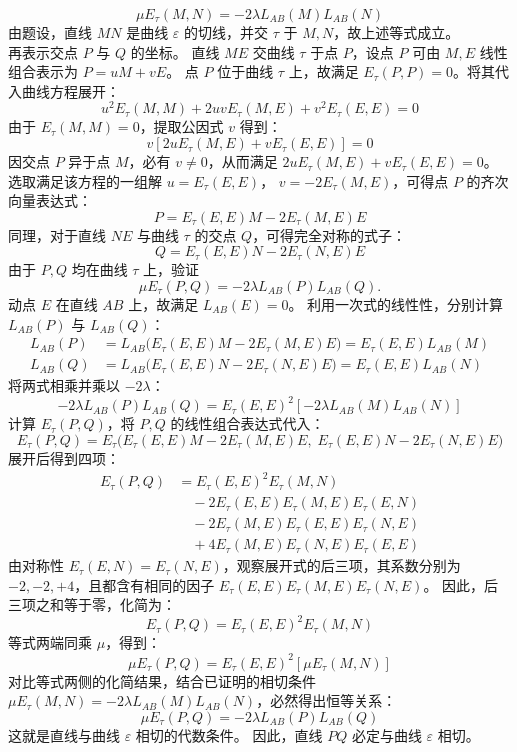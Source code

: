 \begin{solution}
\[ \mu E_\tau(M,N) = -2\lambda L_{AB}(M)L_{AB}(N) \]
由题设，直线 $MN$ 是曲线 $\varepsilon$ 的切线，并交 $\tau$ 于 $M, N$，故上述等式成立。\\
再表示交点 $P$ 与 $Q$ 的坐标。
直线 $ME$ 交曲线 $\tau$ 于点 $P$，设点 $P$ 可由 $M, E$ 线性组合表示为 $P = u M + v E$。
点 $P$ 位于曲线 $\tau$ 上，故满足 $E_\tau(P,P) = 0$。将其代入曲线方程展开：
\[ u^2 E_\tau(M,M) + 2uv E_\tau(M,E) + v^2 E_\tau(E,E) = 0 \]
由于 $E_\tau(M,M) = 0$，提取公因式 $v$ 得到：
\[ v [2u E_\tau(M,E) + v E_\tau(E,E)] = 0 \]
因交点 $P$ 异于点 $M$，必有 $v \neq 0$，从而满足 $2u E_\tau(M,E) + v E_\tau(E,E) = 0$。
选取满足该方程的一组解 $u = E_\tau(E,E)$， $v = -2E_\tau(M,E)$，可得点 $P$ 的齐次向量表达式：
\[ P = E_\tau(E,E)M - 2E_\tau(M,E)E \]
同理，对于直线 $NE$ 与曲线 $\tau$ 的交点 $Q$，可得完全对称的式子：
\[ Q = E_\tau(E,E)N - 2E_\tau(N,E)E \]
由于 $P,Q$ 均在曲线 $\tau$ 上，验证
\[
\mu E_\tau(P,Q)=-2\lambda L_{AB}(P)L_{AB}(Q).
\]
动点 $E$ 在直线 $AB$ 上，故满足 $L_{AB}(E) = 0$。
利用一次式的线性性，分别计算 $L_{AB}(P)$ 与 $L_{AB}(Q)$：
\begin{align*}
L_{AB}(P) &= L_{AB} \big( E_\tau(E,E)M - 2E_\tau(M,E)E \big) = E_\tau(E,E)L_{AB}(M) \\
L_{AB}(Q) &= L_{AB} \big( E_\tau(E,E)N - 2E_\tau(N,E)E \big) = E_\tau(E,E)L_{AB}(N)
\end{align*}
将两式相乘并乘以 $-2\lambda$：
\[ -2\lambda L_{AB}(P)L_{AB}(Q) = E_\tau(E,E)^2 [ -2\lambda L_{AB}(M)L_{AB}(N) ] \]
计算 $E_\tau(P,Q)$，将 $P, Q$ 的线性组合表达式代入：
\[ E_\tau(P,Q) = E_\tau \big( E_\tau(E,E)M - 2E_\tau(M,E)E, \; E_\tau(E,E)N - 2E_\tau(N,E)E \big) \]
展开后得到四项：
\begin{align*}
E_\tau(P,Q) &= E_\tau(E,E)^2 E_\tau(M,N) \\
&\quad - 2E_\tau(E,E)E_\tau(M,E)E_\tau(E,N) \\
&\quad - 2E_\tau(M,E)E_\tau(E,E)E_\tau(N,E) \\
&\quad + 4E_\tau(M,E)E_\tau(N,E)E_\tau(E,E)
\end{align*}
由对称性 $E_\tau(E,N) = E_\tau(N,E)$，观察展开式的后三项，其系数分别为 $-2, -2, +4$，且都含有相同的因子 $E_\tau(E,E)E_\tau(M,E)E_\tau(N,E)$。
因此，后三项之和等于零，化简为：
\[ E_\tau(P,Q) = E_\tau(E,E)^2 E_\tau(M,N) \]
等式两端同乘 $\mu$，得到：
\[ \mu E_\tau(P,Q) = E_\tau(E,E)^2 [ \mu E_\tau(M,N) ] \]
对比等式两侧的化简结果，结合已证明的相切条件 $\mu E_\tau(M,N) = -2\lambda L_{AB}(M)L_{AB}(N)$，必然得出恒等关系：
\[ \mu E_\tau(P,Q) = -2\lambda L_{AB}(P)L_{AB}(Q) \]
这就是直线与曲线 $\varepsilon$ 相切的代数条件。
因此，直线 $PQ$ 必定与曲线 $\varepsilon$ 相切。
\end{solution}



